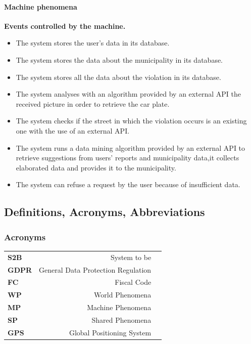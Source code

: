 \documentclass[titlepage]{article}
\begin{document}
\paragraph{Machine phenomena\\}
\textbf{Events controlled by the machine.} 
\begin{itemize}
	\item The system stores the user's data in its database.
	\item The system stores the data about the 					municipality in its database.
	\item The system stores all the data about the violation in its database.
	\item The system analyses with an algorithm provided by an external API the received picture in order to retrieve the car plate.
	\item The system checks if the street in which the 				violation occurs is an existing one with the use of an external API.
	\item The system runs a data mining algorithm provided by an external API to retrieve suggestions from users' reports and municipality data,it collects elaborated data and provides it to the municipality.
	\item The system can refuse a request by the user because of insufficient data.
\end{itemize}

\subsection{Definitions, Acronyms, Abbreviations}




\subsubsection{Acronyms}

\begin{tabular}{|l|rl|}
\hline

\textbf{S2B}	& System to be 	&				 			 \\
\textbf{GDPR}	& General Data Protection Regulation &	     \\
\textbf{FC}     & Fiscal Code    	&	 				 \\
\textbf{WP}     & World Phenomena       &	 				 \\
\textbf{MP}     & Machine Phenomena     &	 				 \\
\textbf{SP}     & Shared Phenomena      &     				 \\
\textbf{GPS}    & Global Positioning System &	 			 \\

\hline
\end{tabular}
\end{document}

